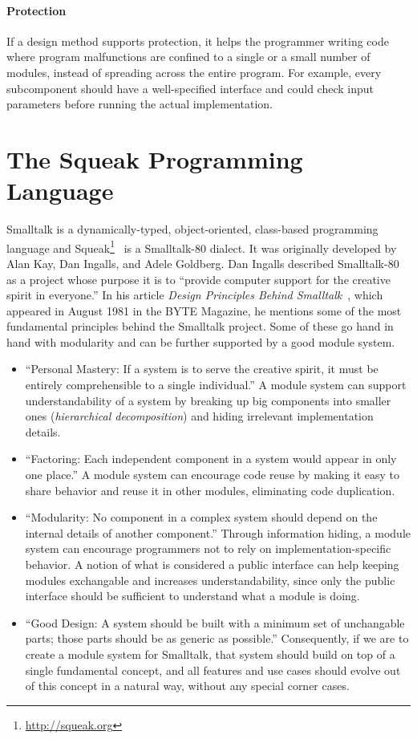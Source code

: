 \paragraph{Protection}
If a design method supports protection, it helps the programmer writing code where program malfunctions are confined to a single or a small number of modules, instead of spreading across the entire program. For example, every subcomponent should have a well-specified interface and could check input parameters before running the actual implementation.

\section{The Squeak Programming Language}
\label{sec:intro_squeak_prog}
Smalltalk is a dynamically-typed, object-oriented, class-based programming language and Squeak\footnote{\url{http://squeak.org}}~\cite{Ingalls:1997:BFS:263698.263754} is a Smalltalk-80 dialect. It was originally developed by Alan Kay, Dan Ingalls, and Adele Goldberg. Dan Ingalls described Smalltalk-80 as a project whose purpose it is to ``provide computer support for the creative spirit in everyone.'' In his article \emph{Design Principles Behind Smalltalk}~\cite{Inga81a}, which appeared in August 1981 in the BYTE Magazine, he mentions some of the most fundamental principles behind the Smalltalk project. Some of these go hand in hand with modularity and can be further supported by a good module system.

\begin{itemize}
	\item ``Personal Mastery: If a system is to serve the creative spirit, it must be entirely comprehensible to a single individual.'' A module system can support understandability of a system by breaking up big components into smaller ones (\emph{hierarchical decomposition}) and hiding irrelevant implementation details.
	\item ``Factoring: Each independent component in a system would appear in only one place.'' A module system can encourage code reuse by making it easy to share behavior and reuse it in other modules, eliminating code duplication. %
	\item ``Modularity: No component in a complex system should depend on the internal details of another component.'' Through information hiding, a module system can encourage programmers not to rely on implementation-specific behavior. A notion of what is considered a public interface can help keeping modules exchangable and increases understandability, since only the public interface should be sufficient to understand what a module is doing.
	\item ``Good Design: A system should be built with a minimum set of unchangable parts; those parts should be as generic as possible.'' Consequently, if we are to create a module system for Smalltalk, that system should build on top of a single fundamental concept, and all features and use cases should evolve out of this concept in a natural way, without any special corner cases.
\end{itemize}

